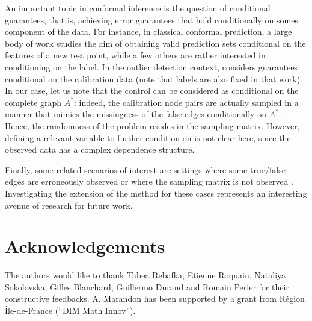 \documentclass[a4paper, 11pt]{article}
\theoremstyle{remark}
\begin{document}
An important topic in conformal inference is the question of conditional guarantees, that is, achieving error guarantees that hold conditionally on somes component of the data. For instance, in classical conformal prediction, a large body of work \citep{foygel2021limits, romano2020classification, romano2019conformalized} studies the aim of obtaining valid prediction sets conditional on the features of a new test point, while a few others \citep{lofstrom2015bias, sadinle2019least} are rather interested in conditioning on the label. In the outlier detection context, \cite{bates2023testing} considers guarantees conditional on the calibration data (note that labels are also fixed in that work). In our case, let us note that the control can be considered as conditional on the complete graph $A^*$: indeed, the calibration node pairs are actually sampled in a manner that mimics the missingness of the false edges conditionally on $A^*$. Hence, the randomness of the problem resides in the sampling matrix. However, defining a relevant variable to further condition on is not clear here, since the observed data has a complex dependence structure. 


Finally, some related scenarios of interest are settings where some true/false edges are erroneously observed or where the sampling matrix is not observed \citep{levina17}.
Investigating the extension of the method for these cases represents an interesting avenue of research for future work.  

\section*{Acknowledgements}
The authors would like to thank Tabea Rebafka, Etienne Roquain, Nataliya Sokolovska, Gilles Blanchard, Guillermo Durand and Romain Perier for their constructive feedbacks. A. Marandon has been supported by a grant from R\'egion \^Ile-de-France (``DIM Math Innov'').




\end{document}
